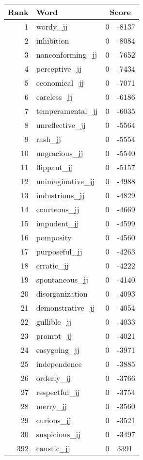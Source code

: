 \begin{longtable}[!htbp]{| rlr@{.}l |}
    \hline
    \textbf{Rank} & \textbf{Word} & \multicolumn{2}{c|}{\textbf{Score}} \\
    \hline
    \endhead
    1 & wordy\_jj & 0 & -8137 \\
    2 & inhibition & 0 & -8084 \\
    3 & nonconforming\_jj & 0 & -7652 \\
    4 & perceptive\_jj & 0 & -7434 \\
    5 & economical\_jj & 0 & -7071 \\
    6 & careless\_jj & 0 & -6186 \\
    7 & temperamental\_jj & 0 & -6035 \\
    8 & unreflective\_jj & 0 & -5564 \\
    9 & rash\_jj & 0 & -5554 \\
    10 & ungracious\_jj & 0 & -5540 \\
    11 & flippant\_jj & 0 & -5157 \\
    12 & unimaginative\_jj & 0 & -4988 \\
    13 & industrious\_jj & 0 & -4829 \\
    14 & courteous\_jj & 0 & -4669 \\
    15 & impudent\_jj & 0 & -4599 \\
    16 & pomposity & 0 & -4560 \\
    17 & purposeful\_jj & 0 & -4263 \\
    18 & erratic\_jj & 0 & -4222 \\
    19 & spontaneous\_jj & 0 & -4140 \\
    20 & disorganization & 0 & -4093 \\
    21 & demonstrative\_jj & 0 & -4054 \\
    22 & gullible\_jj & 0 & -4033 \\
    23 & prompt\_jj & 0 & -4021 \\
    24 & easygoing\_jj & 0 & -3971 \\
    25 & independence & 0 & -3885 \\
    26 & orderly\_jj & 0 & -3766 \\
    27 & respectful\_jj & 0 & -3754 \\
    28 & merry\_jj & 0 & -3560 \\
    29 & curious\_jj & 0 & -3521 \\
    30 & suspicious\_jj & 0 & -3497 \\
    392 & caustic\_jj & 0 & 3391 \\

\end{longtable}
